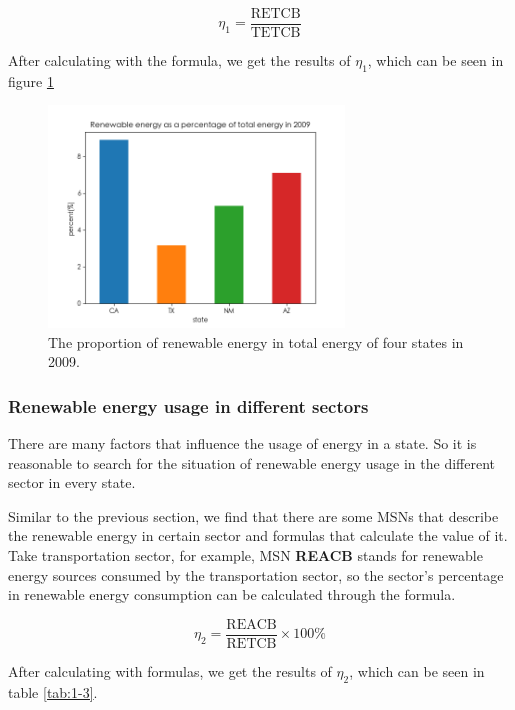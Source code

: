 \documentclass[a4paper,11pt]{article}
\begin{document}
\begin{equation}
    \eta_1=\frac{\text{RETCB}}{\text{TETCB}}
\end{equation}

\par After calculating with the formula, we get the results of $\eta_1$, which can be seen in figure \ref{fig:1-2}

\begin{figure}[H]%
    \centering 
    \includegraphics[width=0.7\textwidth]{./Pic/1-2.png}
    \caption{The proportion of renewable energy in total energy of four states in 2009.}
    \label{fig:1-2}  
\end{figure}
\subsubsection{Renewable energy usage in different sectors}
\par There are many factors that influence the usage of energy in a state. So it is reasonable to search for the situation of renewable energy usage in the different sector in every state.
\par Similar to the previous section, we find that there are some MSNs that describe the renewable energy in certain sector and formulas that calculate the value of it. 
Take transportation sector, for example, MSN \textbf{REACB} stands for renewable energy sources consumed by the transportation sector, so the sector's percentage in renewable energy consumption can be calculated through the formula. 

\begin{equation}
    \eta_2=\frac{\text{REACB}}{\text{RETCB}} \times 100\%
\end{equation}

\par After calculating with formulas, we get the results of $\eta_2 $, which can be seen in table \ref{tab:1-3}.
\end{document}
